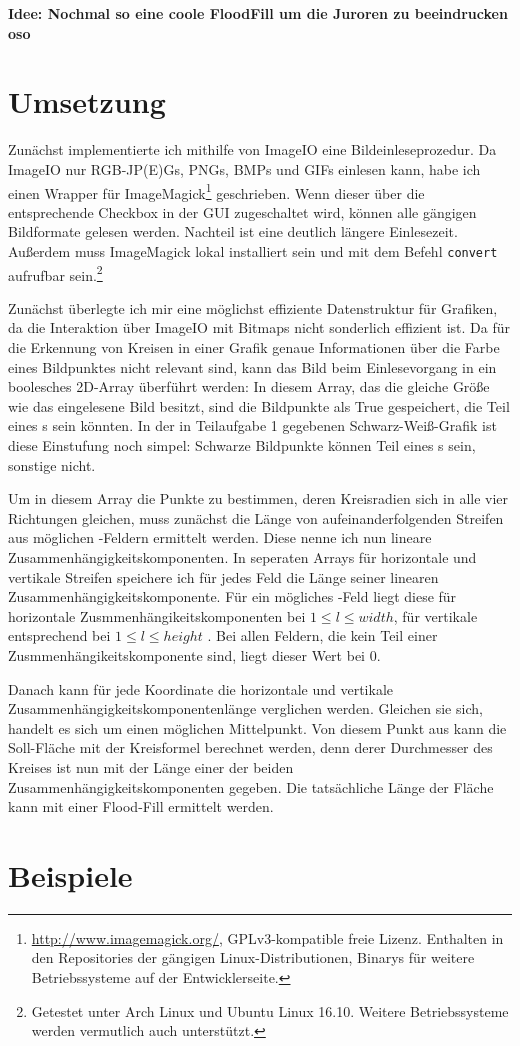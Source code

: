 \textbf{Idee: Nochmal so eine coole FloodFill um die Juroren zu beeindrucken oso}
\section{Umsetzung}
Zunächst implementierte ich mithilfe von ImageIO eine Bildeinleseprozedur. Da ImageIO nur RGB-JP(E)Gs, PNGs, BMPs und GIFs einlesen kann, habe ich einen Wrapper für ImageMagick\footnote{\url{http://www.imagemagick.org/}, GPLv3-kompatible freie Lizenz. Enthalten in den Repositories der gängigen Linux-Distributionen, Binarys für weitere Betriebssysteme auf der Entwicklerseite.} geschrieben. Wenn dieser über die entsprechende Checkbox in der GUI zugeschaltet wird, können alle gängigen Bildformate gelesen werden. Nachteil ist eine deutlich längere Einlesezeit. Außerdem muss ImageMagick lokal installiert sein und mit dem Befehl \texttt{convert} aufrufbar sein.\footnote{Getestet unter Arch Linux und Ubuntu Linux 16.10. Weitere Betriebssysteme werden vermutlich auch unterstützt.}

Zunächst überlegte ich mir eine möglichst effiziente Datenstruktur für Grafiken, da die Interaktion über ImageIO mit Bitmaps nicht sonderlich effizient ist. Da für die Erkennung von Kreisen in einer Grafik genaue Informationen über die Farbe eines Bildpunktes nicht relevant sind, kann das Bild beim Einlesevorgang in ein boolesches 2D-Array überführt werden: In diesem Array, das die gleiche Größe wie das eingelesene Bild besitzt, sind die Bildpunkte als True gespeichert, die Teil eines \task{}s sein könnten. In der in Teilaufgabe 1 gegebenen Schwarz-Weiß-Grafik ist diese Einstufung noch simpel: Schwarze Bildpunkte können Teil eines \task{}s sein, sonstige nicht.

Um in diesem Array die Punkte zu bestimmen, deren Kreisradien sich in alle vier Richtungen gleichen, muss zunächst die Länge von aufeinanderfolgenden Streifen aus möglichen \task{}-Feldern ermittelt werden. Diese nenne ich nun lineare Zusammenhängigkeitskomponenten. In seperaten Arrays für horizontale und vertikale Streifen speichere ich für jedes Feld die Länge seiner linearen Zusammenhängigkeitskomponente. Für ein mögliches \task{}-Feld liegt diese für horizontale Zusmmenhängikeitskomponenten bei \(1 \le l \le width\), für vertikale entsprechend bei
\(1 \le l \le height\)
. Bei allen Feldern, die kein Teil einer Zusmmenhängikeitskomponente sind, liegt dieser Wert bei 0. 

Danach kann für jede Koordinate die horizontale und vertikale Zusammenhängigkeitskomponentenlänge verglichen werden. Gleichen sie sich, handelt es sich um einen möglichen Mittelpunkt. Von diesem Punkt aus kann die Soll-Fläche mit der Kreisformel berechnet werden, denn derer Durchmesser des Kreises ist nun mit der Länge einer der beiden Zusammenhängigkeitskomponenten gegeben. Die tatsächliche Länge der Fläche kann mit einer Flood-Fill ermittelt werden.

\section{Beispiele}
